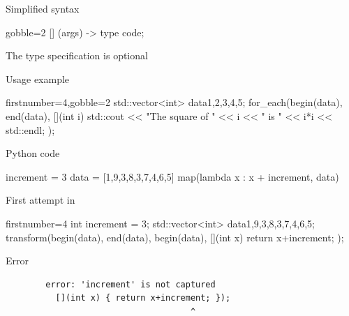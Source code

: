 \begin{frame}[fragile]
  \begin{block}{Simplified syntax}
    \begin{cppcode*}{gobble=2}
      [] (args) -> type {
        code;
      }
    \end{cppcode*}
    The type specification is optional
  \end{block}
  \begin{exampleblock}{Usage example}
    \begin{cppcode*}{firstnumber=4,gobble=2}
      std::vector<int> data{1,2,3,4,5};
      for_each(begin(data), end(data),
               [](int i) {
                 std::cout << "The square of " << i
                           << " is " << i*i << std::endl;
               });
    \end{cppcode*}
  \end{exampleblock}
\end{frame}


\begin{frame}[fragile]
  \begin{block}{Python code}
    \begin{pythoncode*}{}
      increment = 3
      data = [1,9,3,8,3,7,4,6,5]
      map(lambda x : x + increment, data)
    \end{pythoncode*}
  \end{block}
  \pause
  \begin{block}{First attempt in \cpp}
    \begin{cppcode*}{firstnumber=4}
      int increment = 3;
      std::vector<int> data{1,9,3,8,3,7,4,6,5};
      transform(begin(data), end(data), begin(data),
                [](int x) { return x+increment; });
    \end{cppcode*}
  \end{block}
  \pause
  \begin{alertblock}{Error}
    \begin{verbatim}
        error: 'increment' is not captured
          [](int x) { return x+increment; });
                                     ^
    \end{verbatim}
  \end{alertblock}
\end{frame}

